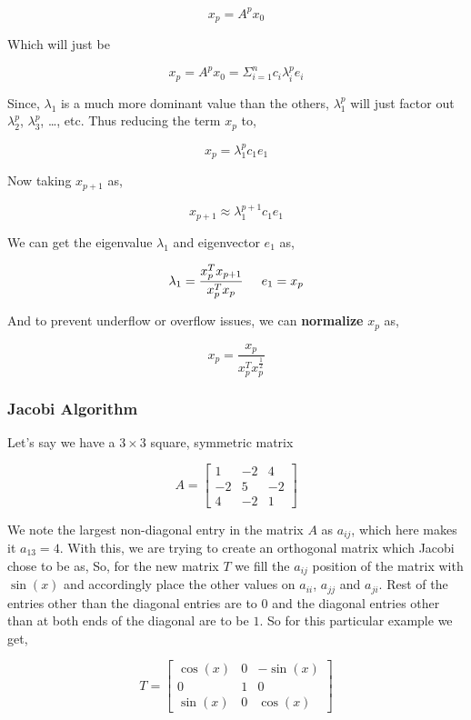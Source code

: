 \documentclass{article}
\newcommand\tab[1][0.5cm]{\hspace*{#1}}
\begin{document}
\[
    x_{p} = A^{p}x_{0}
\]

Which will just be 

\[
    x_{p} = A^{p}x_{0} = \Sigma_{i = 1}^{n} c_{i}\lambda_{i}^{p}e_{i}
\]

Since, $\lambda_{1}$ is a much more dominant value than the others, $\lambda_{1}^{p}$ will just factor out $\lambda_{2}^{p}$, $\lambda_{3}^{p}$, \dots, etc. Thus reducing the term $x_{p}$ to,

\[
    x_{p} = \lambda_{1}^{p}c_{1}e_{1} 
\]

Now taking $x_{p+1}$ as,

\[
    x_{p+1} \approx \lambda_{1}^{p+1}c_{1}e_{1} 
\]

We can get the eigenvalue $\lambda_{1}$ and eigenvector $e_{1}$ as,

\[
    \lambda_{1} = \frac{x_{p}^{T}x_{p+1}}{x_{p}^{T}x_{p}}
    \text{\tab}
    e_{1} = x_{p}
\]

And to prevent underflow or overflow issues, we can \textbf{normalize} $x_{p}$ as,

\[
    x_{p} = \frac{x_{p}}{x_{p}^{T}x_{p}^{\frac{1}{2}}}
\]

\subsubsection{Jacobi Algorithm}

Let's say we have a $3 \times 3$ square, symmetric matrix

\[
    A = 
    \begin{bmatrix}
        1 & -2 & 4 \\
        -2 & 5 & -2 \\
        4 & -2 & 1
    \end{bmatrix}  
\]

We note the largest non-diagonal entry in the matrix $A$ as $a_{ij}$, which here makes it $a_{13} = 4$. With this, we are trying to create an orthogonal matrix which Jacobi chose to be as,
So, for the new matrix $T$ we fill the $a_{ij}$ position of the matrix with $\sin(x)$ and accordingly place the other values on $a_{ii}$, $a_{jj}$ and $a_{ji}$. 
Rest of the entries other than the diagonal entries are to $0$ and the diagonal entries other than at both ends of the diagonal are to be $1$. So for this particular example we get,

\[
    T = 
    \begin{bmatrix}
        \cos(x) & 0 & -\sin(x) \\
        0 & 1 & 0 \\
        \sin(x) & 0 & \cos(x)    
    \end{bmatrix}
\]
\end{document}
